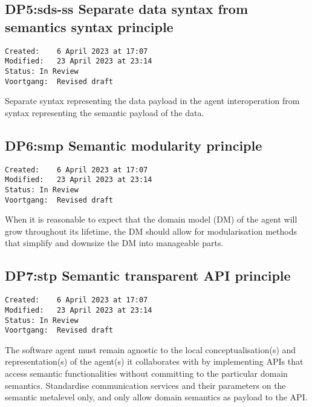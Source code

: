 \documentclass[sort&compress,preprint,3p,authoryear,twocolumn]{elsarticle}
\theoremstyle{break}			%
\begin{document}
\subsection{DP5:sds-ss Separate data syntax from semantics syntax
principle}\label{dp5sds-ss-separate-data-syntax-from-semantics-syntax-principle}

\begin{verbatim}
Created:    6 April 2023 at 17:07
Modified:   23 April 2023 at 23:14
Status: In Review
Voortgang:  Revised draft
\end{verbatim}

Separate syntax representing the data payload in the agent
interoperation from syntax representing the semantic payload of the
data.

\subsection{DP6:smp Semantic modularity
principle}\label{dp6smp-semantic-modularity-principle}

\begin{verbatim}
Created:    6 April 2023 at 17:07
Modified:   23 April 2023 at 23:14
Status: In Review
Voortgang:  Revised draft
\end{verbatim}

When it is reasonable to expect that the domain model (DM) of the agent
will grow throughout its lifetime, the DM should allow for
modularisation methods that simplify and downsize the DM into manageable
parts.

\subsection{DP7:stp Semantic transparent API
principle}\label{dp7stp-semantic-transparent-api-principle}

\begin{verbatim}
Created:    6 April 2023 at 17:07
Modified:   23 April 2023 at 23:14
Status: In Review
Voortgang:  Revised draft
\end{verbatim}

The software agent must remain agnostic to the local
conceptualisation(s) and representation(s) of the agent(s) it
collaborates with by implementing APIs that access semantic
functionalities without committing to the particular domain semantics.
Standardise communication services and their parameters on the semantic
metalevel only, and only allow domain semantics as payload to the API.
\end{document}
